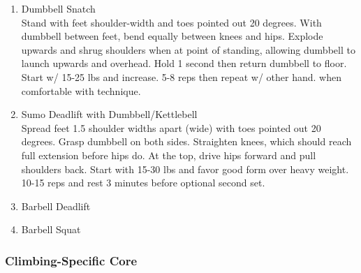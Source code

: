 \documentclass[12pt, letterpaper]{article}
\begin{document}
\begin{enumerate}

    \item Dumbbell Snatch\\ 
          Stand with feet shoulder-width and toes pointed out 20 degrees. With dumbbell between feet, bend equally between knees and hips. 
          Explode upwards and shrug shoulders when at point of standing, allowing dumbbell to launch upwards and overhead. 
          Hold 1 second then return dumbbell to floor. Start w/ 15-25 lbs and increase. 5-8 reps then repeat w/ other hand. 
          when comfortable with technique.
    \item Sumo Deadlift with Dumbbell/Kettlebell\\ 
          Spread feet 1.5 shoulder widths apart (wide) with toes pointed out 20 degrees. Grasp dumbbell on both sides. 
          Straighten knees, which should reach full extension before hips do. At the top, drive hips forward and pull
          shoulders back. Start with 15-30 lbs and favor good form over heavy weight. 
          10-15 reps and rest 3 minutes before optional second set.
    \item Barbell Deadlift \\ 
    \item Barbell Squat \\ 
    
\end{enumerate}

\subsubsection{Climbing-Specific Core}
\end{document}
